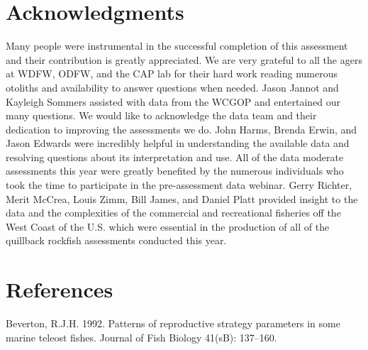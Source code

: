 \documentclass[11pt,
  english,
  letterpaper,
]{article}
\begin{document}

\hypertarget{acknowledgments}{%
\section{Acknowledgments}\label{acknowledgments}}

\leavevmode\tagmcend\tagstructend


Many people were instrumental in the successful completion of this assessment and their contribution is greatly appreciated. We are very grateful to all the agers at WDFW, ODFW, and the CAP lab for their hard work reading numerous otoliths and availability to answer questions when needed. Jason Jannot and Kayleigh Sommers assisted with data from the WCGOP and entertained our many questions. We would like to acknowledge the data team and their dedication to improving the assessments we do. John Harms, Brenda Erwin, and Jason Edwards were incredibly helpful in understanding the available data and resolving questions about its interpretation and use. All of the data moderate assessments this year were greatly benefited by the numerous individuals who took the time to participate in the pre-assessment data webinar. Gerry Richter, Merit McCrea, Louis Zimm, Bill James, and Daniel Platt provided insight to the data and the complexities of the commercial and recreational fisheries off the West Coast of the U.S. which were essential in the production of all of the quillback rockfish assessments conducted this year.

\leavevmode\tagmcend\tagstructend\par

\clearpage


\hypertarget{references}{%
\section{References}\label{references}}

\leavevmode\tagmcend\tagstructend


\hypertarget{refs}{}
\leavevmode\hypertarget{ref-Beverton_1992}{}%
Beverton, R.J.H. 1992. Patterns of reproductive strategy parameters in some marine teleost fishes. Journal of Fish Biology 41(sB): 137--160.
\end{document}
